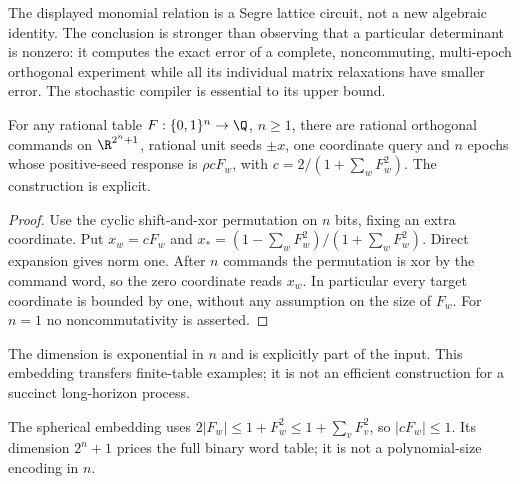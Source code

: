The displayed monomial relation is a Segre lattice circuit, not a new
algebraic identity. The conclusion is stronger than observing that a
particular determinant is nonzero: it computes the exact error of a
complete, noncommuting, multi-epoch orthogonal experiment while all its
individual matrix relaxations have smaller error. The stochastic
compiler is essential to its upper bound.

\begin{proposition}\label{prop:embedding50}
For any rational table $F:\{0,1\}^n\to\Q$, $n\ge1$, there are rational
orthogonal commands on $\R^{2^n+1}$, rational unit seeds $\pm x$, one
coordinate query and $n$ epochs whose positive-seed response is
$\rho cF_w$, with $c=2/(1+\sum_wF_w^2)$. The construction is explicit.
\end{proposition}
\begin{proof}
Use the cyclic shift-and-xor permutation on $n$ bits, fixing an extra
coordinate. Put $x_w=cF_w$ and
$x_*=(1-\sum_wF_w^2)/(1+\sum_wF_w^2)$. Direct expansion gives norm
one. After $n$ commands the permutation is xor by the command word,
so the zero coordinate reads $x_w$. In particular every target
coordinate is bounded by one, without any assumption on the size of
$F_w$. For $n=1$ no noncommutativity is asserted.
\end{proof}
The dimension is exponential in $n$ and is explicitly part of the
input. This embedding transfers finite-table examples; it is not an
efficient construction for a succinct long-horizon process.

The spherical embedding uses $2|F_w|\le1+F_w^2\le1+\sum_vF_v^2$, so $|cF_w|\le1$. Its dimension $2^n+1$ prices the full binary word table; it is not a polynomial-size encoding in $n$.

